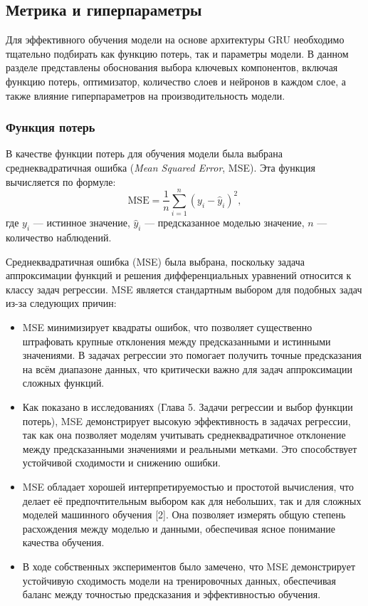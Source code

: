 \subsection{Метрика и гиперпараметры}
\label{subsec:task4}

Для эффективного обучения модели на основе архитектуры GRU необходимо тщательно подбирать как функцию потерь, так и параметры модели. В данном разделе представлены обоснования выбора ключевых компонентов, включая функцию потерь, оптимизатор, количество слоев и нейронов в каждом слое, а также влияние гиперпараметров на производительность модели.

\subsubsection{Функция потерь}

В качестве функции потерь для обучения модели была выбрана среднеквадратичная ошибка (\textit{Mean Squared Error}, MSE). Эта функция вычисляется по формуле:
\[
\text{MSE} = \frac{1}{n} \sum_{i=1}^{n} (y_i - \hat{y}_i)^2,
\]
где \( y_i \) — истинное значение, \( \hat{y}_i \) — предсказанное моделью значение, \( n \) — количество наблюдений.

Среднеквадратичная ошибка (MSE) была выбрана, поскольку задача аппроксимации функций и решения дифференциальных уравнений относится к классу задач регрессии. MSE является стандартным выбором для подобных задач из-за следующих причин:
\begin{itemize}
    \item MSE минимизирует квадраты ошибок, что позволяет существенно штрафовать крупные отклонения между предсказанными и истинными значениями. В задачах регрессии это помогает получить точные предсказания на всём диапазоне данных, что критически важно для задач аппроксимации сложных функций.
    \item Как показано в исследованиях \cite{Goodfellow} (Глава 5. Задачи регрессии и выбор функции потерь), MSE демонстрирует высокую эффективность в задачах регрессии, так как она позволяет моделям учитывать среднеквадратичное отклонение между предсказанными значениями и реальными метками. Это способствует устойчивой сходимости и снижению ошибки.
    \item MSE обладает хорошей интерпретируемостью и простотой вычисления, что делает её предпочтительным выбором как для небольших, так и для сложных моделей машинного обучения [2]. Она позволяет измерять общую степень расхождения между моделью и данными, обеспечивая ясное понимание качества обучения.
    \item В ходе собственных экспериментов было замечено, что MSE демонстрирует устойчивую сходимость модели на тренировочных данных, обеспечивая баланс между точностью предсказания и эффективностью обучения.
\end{itemize}

